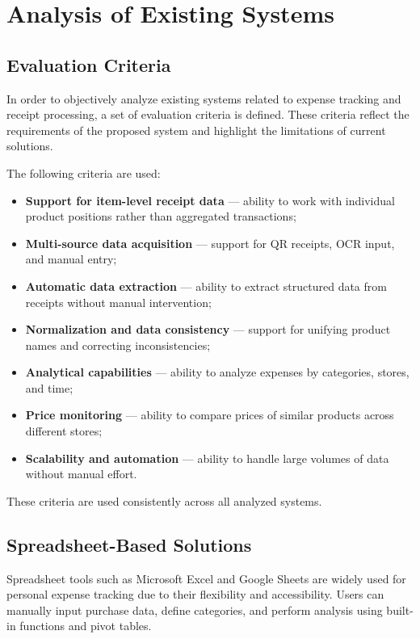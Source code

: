 %
%
\chapter{Analysis of Existing Systems}
\label{chap:02}
\setlength{\parskip}{1em}
%

\section{Evaluation Criteria}

In order to objectively analyze existing systems related to expense tracking and receipt processing, a set of evaluation criteria is defined. These criteria reflect the requirements of the proposed system and highlight the limitations of current solutions.

The following criteria are used:

\begin{itemize}
    \item \textbf{Support for item-level receipt data} — ability to work with individual product positions rather than aggregated transactions;
    \item \textbf{Multi-source data acquisition} — support for QR receipts, OCR input, and manual entry;
    \item \textbf{Automatic data extraction} — ability to extract structured data from receipts without manual intervention;
    \item \textbf{Normalization and data consistency} — support for unifying product names and correcting inconsistencies;
    \item \textbf{Analytical capabilities} — ability to analyze expenses by categories, stores, and time;
    \item \textbf{Price monitoring} — ability to compare prices of similar products across different stores;
    \item \textbf{Scalability and automation} — ability to handle large volumes of data without manual effort.
\end{itemize}

These criteria are used consistently across all analyzed systems.

\section{Spreadsheet-Based Solutions}

Spreadsheet tools such as Microsoft Excel and Google Sheets are widely used for personal expense tracking due to their flexibility and accessibility. Users can manually input purchase data, define categories, and perform analysis using built-in functions and pivot tables.

